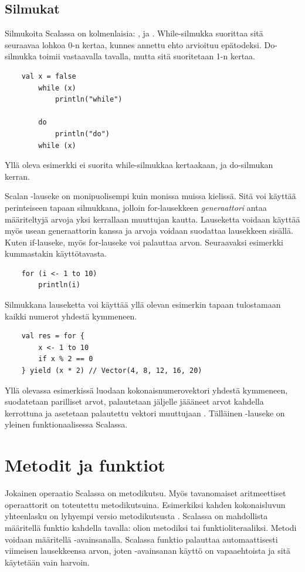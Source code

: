 \subsection{Silmukat}
Silmukoita Scalassa on kolmenlaisia: ,  ja . While-silmukka suorittaa sitä seuraavaa lohkoa 0-n kertaa, kunnes annettu ehto arvioituu epätodeksi. Do-silmukka toimii vastaavalla tavalla, mutta sitä suoritetaan 1-n kertaa.
\begin{lstlisting}
    val x = false
		while (x)
			println("while")
		
		do
			println("do")
        while (x)
\end{lstlisting}
Yllä oleva esimerkki ei suorita while-silmukkaa kertaakaan, ja do-silmukan kerran.
\cite[Luku 2.5]{scalaForTheImpatient}

Scalan -lauseke on monipuolisempi kuin monissa muissa kielissä. Sitä voi käyttää perinteiseen tapaan silmukkana, jolloin for-lausekkeen \textit{generaattori} antaa määriteltyjä arvoja yksi kerrallaan muuttujan  kautta. Lauseketta voidaan käyttää myös usean generaattorin kanssa ja arvoja voidaan suodattaa lausekkeen sisällä. Kuten if-lauseke, myös for-lauseke voi palauttaa arvon. Seuraavaksi esimerkki kummastakin käyttötavasta.
\begin{lstlisting}
    for (i <- 1 to 10)
        println(i)
\end{lstlisting}
Silmukkana lauseketta voi käyttää yllä olevan esimerkin tapaan tulostamaan kaikki numerot yhdestä kymmeneen.
\begin{lstlisting}
    val res = for {
        x <- 1 to 10
        if x % 2 == 0
    } yield (x * 2) // Vector(4, 8, 12, 16, 20)
\end{lstlisting}
Yllä olevassa esimerkissä luodaan kokonaisnumerovektori yhdestä kymmeneen, suodatetaan parilliset arvot, palautetaan jäljelle jäääneet arvot kahdella kerrottuna ja asetetaan palautettu vektori muuttujaan . Tälläinen -lauseke on yleinen funktionaalisessa Scalassa.
\cite[Luku 2.6]{scalaForTheImpatient}


\section{Metodit ja funktiot} \label{MetoditJaFunktiot}
Jokainen operaatio Scalassa on metodikutsu. Myös tavanomaiset aritmeettiset operaattorit on toteutettu metodikutsuina. Esimerkiksi kahden kokonaisluvun yhteenlasku  on lyhyempi versio metodikutsusta . Scalassa on mahdollista määritellä funktio kahdella tavalla: olion metodiksi tai funktioliteraaliksi. Metodi voidaan määritellä -avainsanalla.
Scalassa funktio palauttaa automaattisesti viimeisen lausekkeensa arvon, joten -avainsanan käyttö on vapaaehtoista ja sitä käytetään vain harvoin.
\cite[Luku 1.4]{scalaForTheImpatient}
\cite[Basics]{tourOfScala}

